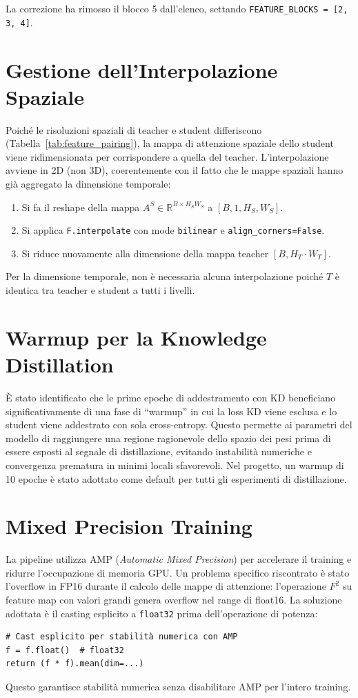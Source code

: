 La correzione ha rimosso il blocco 5 dall'elenco, settando \texttt{FEATURE\_BLOCKS = [2, 3, 4]}.

\section{Gestione dell'Interpolazione Spaziale}

Poiché le risoluzioni spaziali di teacher e student differiscono (Tabella~\ref{tab:feature_pairing}), la mappa di attenzione spaziale dello student viene ridimensionata per corrispondere a quella del teacher. L'interpolazione avviene in 2D (non 3D), coerentemente con il fatto che le mappe spaziali hanno già aggregato la dimensione temporale:

\begin{enumerate}
    \item Si fa il reshape della mappa $A^S \in \mathbb{R}^{B \times H_S W_S}$ a $[B, 1, H_S, W_S]$.
    \item Si applica \texttt{F.interpolate} con mode \texttt{bilinear} e \texttt{align\_corners=False}.
    \item Si riduce nuovamente alla dimensione della mappa teacher $[B, H_T \cdot W_T]$.
\end{enumerate}

Per la dimensione temporale, non è necessaria alcuna interpolazione poiché $T$ è identica tra teacher e student a tutti i livelli.

\section{Warmup per la Knowledge Distillation}

È stato identificato che le prime epoche di addestramento con KD beneficiano significativamente di una fase di ``warmup'' in cui la loss KD viene esclusa e lo student viene addestrato con sola cross-entropy. Questo permette ai parametri del modello di raggiungere una regione ragionevole dello spazio dei pesi prima di essere esposti al segnale di distillazione, evitando instabilità numeriche e convergenza prematura in minimi locali sfavorevoli. Nel progetto, un warmup di 10 epoche è stato adottato come default per tutti gli esperimenti di distillazione.

\section{Mixed Precision Training}

La pipeline utilizza AMP (\textit{Automatic Mixed Precision}) per accelerare il training e ridurre l'occupazione di memoria GPU. Un problema specifico riscontrato è stato l'overflow in FP16 durante il calcolo delle mappe di attenzione: l'operazione $F^2$ su feature map con valori grandi genera overflow nel range di float16. La soluzione adottata è il casting esplicito a \texttt{float32} prima dell'operazione di potenza:

\begin{verbatim}
# Cast esplicito per stabilità numerica con AMP
f = f.float()  # float32
return (f * f).mean(dim=...)
\end{verbatim}

Questo garantisce stabilità numerica senza disabilitare AMP per l'intero training.

